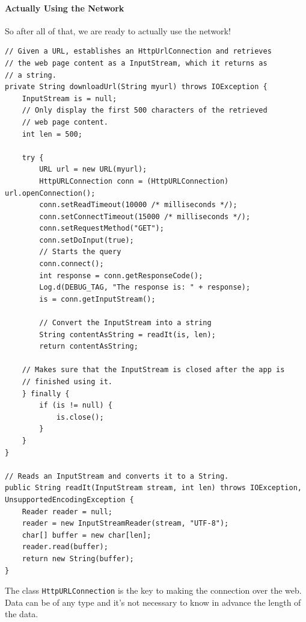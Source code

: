 \paragraph{Actually Using the Network} 
So after all of that, we are ready to actually use the network!

\begin{verbatim}
// Given a URL, establishes an HttpUrlConnection and retrieves
// the web page content as a InputStream, which it returns as
// a string.
private String downloadUrl(String myurl) throws IOException {
    InputStream is = null;
    // Only display the first 500 characters of the retrieved
    // web page content.
    int len = 500;
        
    try {
        URL url = new URL(myurl);
        HttpURLConnection conn = (HttpURLConnection) url.openConnection();
        conn.setReadTimeout(10000 /* milliseconds */);
        conn.setConnectTimeout(15000 /* milliseconds */);
        conn.setRequestMethod("GET");
        conn.setDoInput(true);
        // Starts the query
        conn.connect();
        int response = conn.getResponseCode();
        Log.d(DEBUG_TAG, "The response is: " + response);
        is = conn.getInputStream();

        // Convert the InputStream into a string
        String contentAsString = readIt(is, len);
        return contentAsString;
        
    // Makes sure that the InputStream is closed after the app is
    // finished using it.
    } finally {
        if (is != null) {
            is.close();
        } 
    }
}

// Reads an InputStream and converts it to a String.
public String readIt(InputStream stream, int len) throws IOException, UnsupportedEncodingException {
    Reader reader = null;
    reader = new InputStreamReader(stream, "UTF-8");        
    char[] buffer = new char[len];
    reader.read(buffer);
    return new String(buffer);
}
\end{verbatim}

The class \texttt{HttpURLConnection} is the key to making the connection over the web. Data can be of any type and it's not necessary to know in advance the length of the data. 

